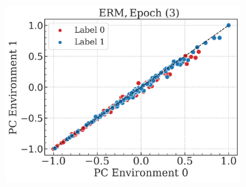 \begin{figure}[H]
\begin{subfigure}[b]{0.32\textwidth}
    \end{subfigure}
    \hfill
    \begin{subfigure}[b]{0.32\textwidth}
        \centering
        \includegraphics[width=\textwidth]{img/results_discussion/datashift/NL_5.png}
    \end{subfigure}

    \vspace{1em}


\end{figure}

